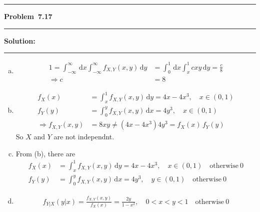 \documentclass[10.5pt]{article}
\newcommand\question[1]{\vspace{.2in}\hrule\vspace{0.04in}\textbf{Problem\ #1}\vspace{.4em}\hrule\vspace{.10in}}
\newcommand\Solution{\vspace{.3in}\textbf{Solution:}\vspace{.5em}\hrule\vspace{.08in}\par}
\begin{document}
\pagebreak
\question{7.17}
\Solution{}
\begin{enumerate}[(a)]
	\item \begin{align*}
		1 = \int_{-\infty}^{\infty}\,\mathrm{d}x\int_{-\infty}^{\infty} f_{X, Y}(x, y)\,\mathrm{d}y &= \int_{0}^{1}\,\mathrm{d}x\int_{x}^{1} cxy\,\mathrm{d}y = \frac{c}{8}\\[6pt]
		\Rightarrow c &= 8
	\end{align*}\vspace{0.5cm}
	\item \begin{align*}
		f_X(x) &= \int_{x}^1f_{X, Y}(x, y)\,\mathrm{d}y = 4x - 4x^3,\quad x\in(0, 1)\\[8pt]
		f_Y(y) &= \int_{0}^yf_{X, Y}(x, y)\,\mathrm{d}x = 4y^3,\quad x\in(0, 1)\\[8pt]
		\Rightarrow f_{X, Y}(x, y) &= 8xy\neq (4x - 4x^3)4y^3= f_X(x)\, f_Y(y)
	\end{align*}
	So $X$ and $Y$ are not independnt.\vspace{0.5cm}
	\item From (b), there are\begin{align*}
		f_X(x) &= \int_{x}^1f_{X, Y}(x, y)\,\mathrm{d}y = 4x - 4x^3,\quad x\in(0, 1)\quad\text{otherwise}\ 0\\[8pt]
		f_Y(y) &= \int_{0}^yf_{X, Y}(x, y)\,\mathrm{d}x = 4y^3,\quad y\in(0, 1)\quad\text{otherwise}\ 0\end{align*}\vspace{0.5cm}
	\item \begin{align*}
		f_{Y|X}(y|x) = \frac{f_{X, Y}(x, y)}{f_{X}(x)} = \frac{2y}{1 - x^2},\quad 0<x<y<1\quad\text{otherwise}\ 0
	\end{align*}
\end{enumerate}
\pagebreak
\end{document}
